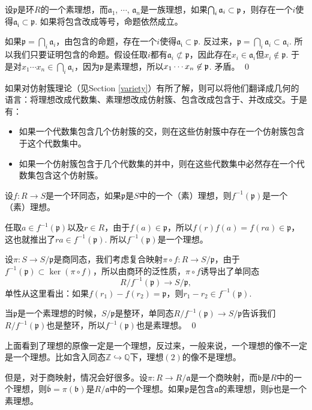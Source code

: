 \pro \label{primeau}设$\mathfrak{p}$是环$R$的一个素理想，而$\mathfrak{a}_1$, $\cdots$, $\mathfrak{a}_n$是一族理想，如果$\bigcap_i \mathfrak{a}_i\subset \mathfrak{p}$，则存在一个$i$使得$\mathfrak{a_i}\subset \mathfrak{p}$. 如果将包含改成等号，命题依然成立。

\proof
	如果$\mathfrak{p}=\bigcap_i \mathfrak{a}_i$，由包含的命题，存在一个$i$使得$\mathfrak{a_i}\subset \mathfrak{p}$. 反过来，$\mathfrak{p}=\bigcap_i \mathfrak{a}_i\subset \mathfrak{a}_i$. 所以我们只要证明包含的命题。假设任取$i$都有$\mathfrak{a}_i\not\subset \mathfrak{p}$，因此存在$x_i\in\mathfrak{a}_i$但$x_i\not\in \mathfrak{p}$. 于是对$x_1\cdots x_n\in \bigcap_{i} \mathfrak{a}_i$，因为$\mathfrak{p}$是素理想，所以$x_1\cdots x_n\not\in \mathfrak{p}$. 矛盾。
\qed

\para 如果对仿射簇理论（见Section \ref{variety}）有所了解，则可以将他们翻译成几何的语言：将理想改成代数集、素理想改成仿射簇、包含改成包含于、并改成交。于是有：
\begin{itemize}
\item 如果一个代数集包含几个仿射簇的交，则在这些仿射簇中存在一个仿射簇包含于这个代数集中。
\item 如果一个仿射簇包含于几个代数集的并中，则在这些代数集中必然存在一个代数集包含这个仿射簇。
\end{itemize}

\para 设$f:R\to S$是一个环同态，如果$\mathfrak{p}$是$S$中的一个（素）理想，则$f^{-1}(\mathfrak{p})$是一个（素）理想。

\proof
	任取$a\in f^{-1}(\mathfrak{p})$以及$r\in R$，由于$f(a)\in \mathfrak{p}$，所以$f(r)f(a)=f(ra)\in \mathfrak{p}$，这也就推出了$ra\in f^{-1}(\mathfrak{p})$. 所以$f^{-1}(\mathfrak{p})$是一个理想。

	设$\pi:S\to S/\mathfrak{p}$是商同态，我们考虑复合映射$\pi\circ f:R\to S/\mathfrak{p}$，由于$f^{-1}(\mathfrak{p})\subset \ker(\pi\circ f)$，所以由商环的泛性质，$\pi\circ f$诱导出了单同态\[R/f^{-1}(\mathfrak{p})\to S/\mathfrak{p},\]
	单性从这里看出：如果$f(r_1)-f(r_2)=\mathfrak{p}$，则$r_1-r_2\in f^{-1}(\mathfrak{p})$. 

	当$\mathfrak{p}$是一个素理想的时候，$S/\mathfrak{p}$是整环，单同态$R/f^{-1}(\mathfrak{p})\to S/\mathfrak{p}$告诉我们$R/f^{-1}(\mathfrak{p})$也是整环，所以$f^{-1}(\mathfrak{p})$也是素理想。
\qed

\para 上面看到了理想的原像一定是一个理想，反过来，一般来说，一个理想的像不一定是一个理想。比如含入同态$\mathbb{Z}\hookrightarrow \mathbb{Q}$下，理想$(2)$的像不是理想。

但是，对于商映射，情况会好很多。设$\pi:R\to R/\mathfrak{a}$是一个商映射，而$\mathfrak{b}$是$R$中的一个理想，则$\bar{\mathfrak{b}}=\pi(\mathfrak{b})$是$R/\mathfrak{a}$中的一个理想。如果$\mathfrak{p}$是包含$\mathfrak{a}$的素理想，则$\bar{\mathfrak{p}}$也是一个素理想。

